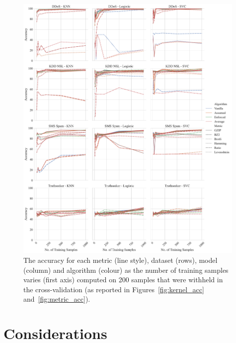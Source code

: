 \documentclass[preprint,12pt]{article}
\begin{document}
\begin{figure}[p]
    \centering
    \includegraphics[width=0.99\textwidth]{images/accuracy_vs_train_size.pdf}
    \caption{The accuracy for each metric (line style), dataset (rows), model (column) and algorithm (colour) as the number of training samples varies (first axis) computed on 200 samples that were withheld in the cross-validation (as reported in Figures~\ref{fig:kernel_acc} and~\ref{fig:metric_acc}).}
    \label{fig:sample_size}
\end{figure}





\section{Considerations}
\label{considerations}
\end{document}
